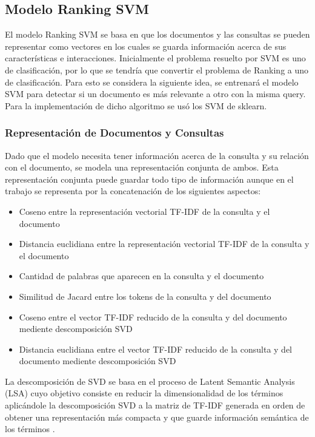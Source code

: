 \documentclass[runningheads]{llncs}
\begin{document}
\subsection{Modelo Ranking SVM}

El modelo Ranking SVM se basa en que los documentos y las consultas se pueden representar como vectores
en los cuales se guarda información acerca de sus características e interacciones. Inicialmente
el problema resuelto por SVM es uno de clasificación, por lo que se tendría que convertir
el problema de Ranking a uno de clasificación. Para esto se considera la siguiente idea, se
entrenará el modelo SVM para detectar si un documento es más relevante a otro con la misma query.
Para la implementación de dicho algoritmo se usó los SVM de sklearn.

\subsubsection{Representación de Documentos y Consultas}

Dado que el modelo necesita tener información acerca de la consulta y su relación con el documento,
se modela una representación conjunta de ambos. Esta representación conjunta puede guardar todo tipo
de información aunque en el trabajo se representa por la concatenación de los siguientes aspectos:

\begin{itemize}
	\item Coseno entre la representación vectorial TF-IDF de la consulta y el documento
	\item Distancia euclidiana entre la representación vectorial TF-IDF de la consulta y el documento
	\item Cantidad de palabras que aparecen en la consulta y el documento
	\item Similitud de Jacard entre los tokens de la consulta y del documento
	\item Coseno entre el vector TF-IDF reducido de la consulta y del documento mediente descomposición SVD
	\item Distancia euclidiana entre el vector TF-IDF reducido de la consulta y del documento mediente descomposición SVD
\end{itemize}

La descomposición de SVD se basa en el proceso de Latent Semantic Analysis (LSA) cuyo objetivo 
consiste en reducir la dimensionalidad de los términos aplicándole la descomposición SVD a la
matriz de TF-IDF generada en orden de obtener una representación más compacta y que guarde 
información semántica de los términos \cite{lsaWiki}.
\end{document}
